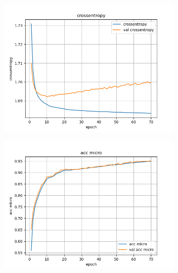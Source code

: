 \documentclass[a4paper]{article}
\begin{document}
\begin{figure}[H]
    \centering
    \begin{subfigure}{0.32\textwidth}
        \centering
        \includegraphics[width=\linewidth]{../logs/fusion/crossentropy.png}
    \end{subfigure}
    \begin{subfigure}{0.32\textwidth}
        \centering
        \includegraphics[width=\linewidth]{../logs/fusion/acc micro.png}
    \end{subfigure}
    \begin{subfigure}{0.32\textwidth}
        \centering

\end{subfigure}
\end{figure}
\end{document}
